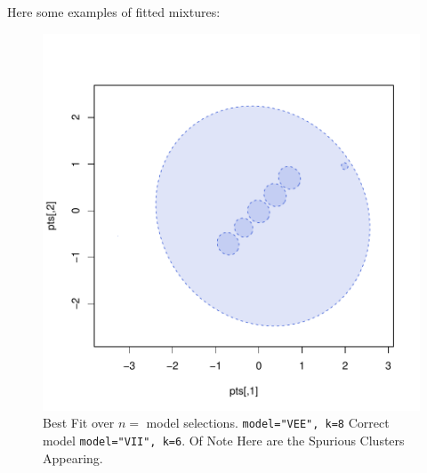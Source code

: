 Here some examples of fitted mixtures:

\begin{figure}[h!]
    \begin{Rgraph}[0.9]
\includegraphics{chapter3-fig214fit}
    \caption{Best Fit over $n=$ model selections. {\tt model="VEE", k=8} Correct
             model {\tt model="VII", k=6}. Of Note Here are the Spurious 
             Clusters Appearing.}%
    \label{fig:MW214bestfit}
    \end{Rgraph}
\end{figure}

